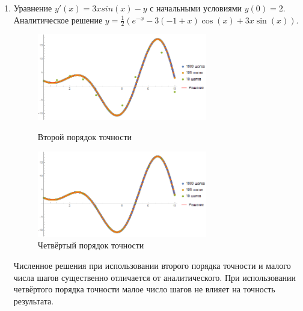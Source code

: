 \documentclass[a4paper,12pt,titlepage,finall]{article}
\begin{document}
\begin{enumerate}
\newpage
\item
Уравнение $y'(x) = 3x sin(x) - y$ с начальными условиями $y(0)=2$. Аналитическое решение $y = \frac{1}{2} (e^{-x} - 3 (-1 + x) \cos (x) + 3 x \sin (x))$.
\begin{figure}[h]
\centering
\includegraphics[width=0.7\textwidth]{test_1_2_2.png}
\caption{Второй порядок точности}
\centering
\includegraphics[width=0.7\textwidth]{test_1_2_4.png}
\caption{Четвёртый порядок точности}
\end{figure}
\par
Численное решения при использовании второго порядка точности и малого числа шагов существенно отличается от аналитического. При использовании четвёртого порядка точности малое число шагов не влияет на точность результата.


\end{enumerate}
\end{document}
